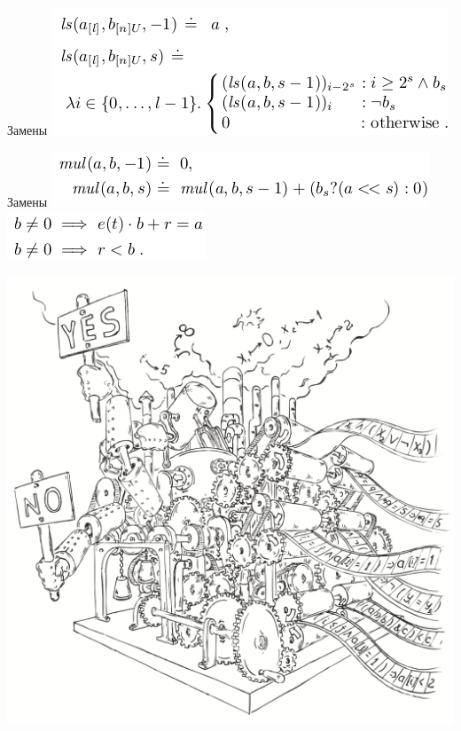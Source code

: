 \documentclass{beamer}
\begin{document}
\begin{frame}{Замены}
\includegraphics[scale=0.5]{ls.png}\newline
\end{frame}

\begin{frame}{Замены}
\includegraphics[scale=0.5]{mul1.png}\newline
\includegraphics[scale=0.5]{div.png}\newline
\end{frame}

\begin{frame}
\includegraphics[scale=0.5]{../decision-procedure.png}
\end{frame}
\end{document}

